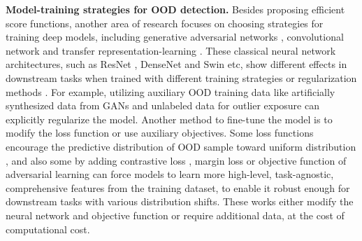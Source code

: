 \documentclass{article} \usepackage{iclr2023_conference,times}
\begin{document}
\textbf{ Model-training strategies for OOD detection.} Besides proposing efficient score functions, another area of research focuses on choosing strategies for training deep models, including generative adversarial networks \citep{schlegl2017unsupervised}, convolutional network \citep{sabokrou2018deep} and transfer representation-learning \citep{andrews2016transfer}. 
These classical neural network architectures, such as ResNet \citep{he2016deep}, DenseNet \citep{huang2017densely} and Swin \citep{liu2021swin} etc, show different effects in downstream tasks when trained with different training strategies or regularization methods \citep{ericsson2021well}.
For example, utilizing auxiliary OOD training data like artificially synthesized data from GANs \citep{lee2017training} and unlabeled data for outlier exposure \citep{hendrycks2018deep} can explicitly regularize the model. 
Another method to fine-tune the model is to modify the loss function or use auxiliary objectives. Some loss functions encourage the predictive distribution of OOD sample toward uniform distribution \citep{lee2017training,hendrycks2018deep}, and also some by adding contrastive loss \citep{winkens2020contrastive}, margin loss 
 \citep{vyas2018out} or objective function of adversarial learning \citep{biggio2018wild,miller2020adversarial,chalapathy2019deep}
can force models to learn more high-level, task-agnostic, comprehensive features from the training dataset, to enable it robust enough for downstream tasks with various distribution shifts. These works either modify the neural network and objective function or require additional data, at the cost of computational cost.
\end{document}
